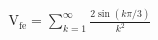 \documentclass[preview]{standalone}
\begin{document}
\begin{align*}
\mathrm{V}_{\mathrm{fe}}=\sum_{k=1}^{\infty}\frac{2\sin\!\left(k\pi/3\right)}{k^2}
\end{align*}
\end{document}
